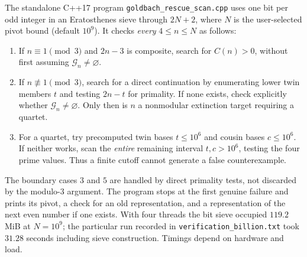 \documentclass[11pt,a4paper]{article}
\theoremstyle{definition}
\theoremstyle{remark}
\newcommand{\G}{\mathcal G}
\begin{document}
The standalone C++17 program \texttt{goldbach\_rescue\_scan.cpp} uses
one bit per odd integer in an Eratosthenes sieve through $2N+2$,
where $N$ is the user-selected pivot bound (default $10^9$).
It checks \emph{every} $4\le n\le N$ as follows:
\begin{enumerate}[label=(\roman*)]
\item If $n\equiv1\pmod3$ and $2n-3$ is composite, search for
      $C(n)>0$, without first assuming $\G_n\ne\varnothing$.
\item If $n\not\equiv1\pmod3$, search for a direct continuation by
      enumerating lower twin members $t$ and testing $2n-t$ for
      primality. If none exists, check explicitly whether
      $\G_n\ne\varnothing$. Only then is $n$ a nonmodular extinction
      target requiring a quartet.
\item For a quartet, try precomputed twin bases $t\le10^6$ and cousin
      bases $c\le10^6$. If neither works, scan the \emph{entire}
      remaining interval $t,c>10^6$, testing the four prime values.
      Thus a finite cutoff cannot generate a false counterexample.
\end{enumerate}
The boundary cases $3$ and $5$ are handled by direct primality tests,
not discarded by the modulo-$3$ argument. The program stops at the
first genuine failure and prints its pivot, a check for an old
representation, and a representation of the next even number if one
exists. With four threads the bit sieve occupied $119.2$ MiB at
$N=10^9$; the particular run recorded in
\texttt{verification\_billion.txt} took $31.28$ seconds including
sieve construction. Timings depend on hardware and load.
\end{document}
